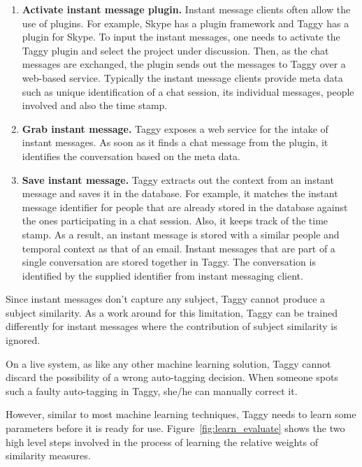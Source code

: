 \begin{enumerate}
	\item \textbf{Activate instant message plugin.} Instant message clients often allow the use of plugins. For example, Skype \cite{skype} has a plugin framework and Taggy has a plugin for Skype. To input the instant messages, one needs to activate the Taggy plugin and select the project under discussion. Then, as the chat messages are exchanged, the plugin sends out the messages to Taggy over a web-based service. Typically the instant message clients provide meta data such as unique identification of a chat session, its individual messages, people involved and also the time stamp.

	\item \textbf{Grab instant message.} Taggy exposes a web service for the intake of instant messages. As soon as it finds a chat message from the plugin, it identifies the conversation based on the meta data.
	
	\item \textbf{Save instant message.} Taggy extracts out the context from an instant message and saves it in the database. For example, it matches the instant message identifier for people that are already stored in the database against the ones participating in a chat session. Also, it keeps track of the time stamp. As a result, an instant message is stored with a similar people and temporal context as that of an email. Instant messages that are part of a single conversation are stored together in Taggy. The conversation is identified by the supplied identifier from instant messaging client.
\end{enumerate}

Since instant messages don't capture any subject, Taggy cannot produce a subject similarity. As a work around for this limitation, Taggy can be trained differently for instant messages where the contribution of subject similarity is ignored.

On a live system, as like any other machine learning solution, Taggy cannot discard the possibility of a wrong auto-tagging decision. When someone spots such a faulty auto-tagging in Taggy, she/he can manually correct it.

However, similar to most machine learning techniques, Taggy needs to learn some parameters before it is ready for use. Figure~\ref{fig:learn_evaluate} shows the two high level steps involved in the process of learning the relative weights of similarity measures. 

